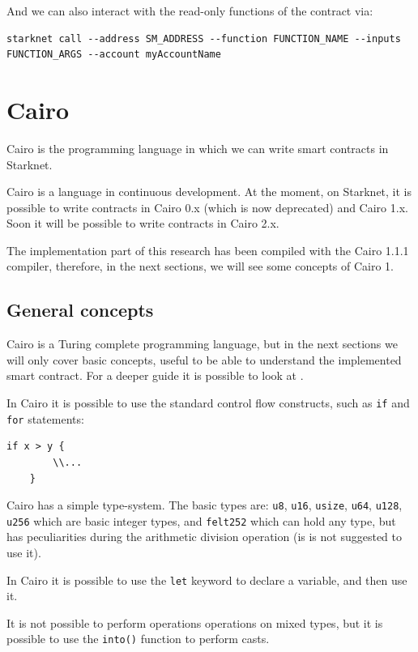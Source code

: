 \documentclass[12pt]{article}
\begin{document}
And we can also interact with the read-only functions of the contract via:
\begin{lstlisting}[language=terminal]
    starknet call --address SM_ADDRESS --function FUNCTION_NAME --inputs FUNCTION_ARGS --account myAccountName
\end{lstlisting}

\section{Cairo} \label{section:cairo}
Cairo is the programming language in which we can write smart contracts in Starknet.

Cairo is a language in continuous development. At the moment, on Starknet, it is possible to write contracts in Cairo 0.x (which is now deprecated) and Cairo 1.x. Soon it will be possible to write contracts in Cairo 2.x.

The implementation part of this research has been compiled with the Cairo 1.1.1 compiler, therefore, in the next sections, we will see some concepts of Cairo 1.

\subsection{General concepts} \label{subsection:general_concepts}
Cairo is a Turing complete programming language, but in the next sections we will only cover basic concepts, useful to be able to understand the implemented smart contract. For a deeper guide it is possible to look at \cite{cairo_documentation}.

In Cairo it is possible to use the standard control flow constructs, such as \verb|if| and \verb|for| statements:
\begin{lstlisting}[language=cairo]
    if x > y {
        \\...
    }
\end{lstlisting}

Cairo has a simple type-system. The basic types are: \verb|u8|, \verb|u16|, \verb|usize|, \verb|u64|, \verb|u128|, \verb|u256| which are basic integer types, and \verb|felt252| which can hold any type, but has peculiarities during the arithmetic division operation (is is not suggested to use it).

In Cairo it is possible to use the \verb|let| keyword to declare a variable, and then use it.

It is not possible to perform operations operations on mixed types, but it is possible to use the \verb|into()| function to perform casts.
\end{document}

